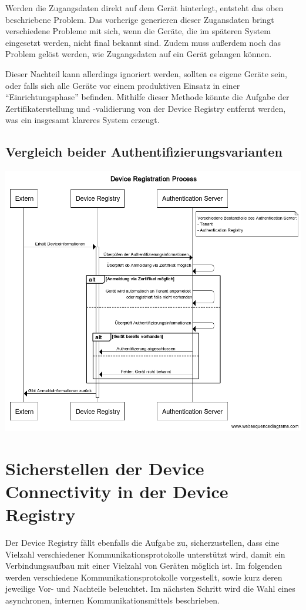 Werden die Zugangsdaten direkt auf dem Gerät hinterlegt, entsteht das oben beschriebene Problem. Das vorherige generieren dieser Zugansdaten bringt verschiedene Probleme mit sich, wenn die Geräte, die im späteren System eingesetzt werden, nicht final bekannt sind. Zudem muss außerdem noch das Problem gelöst werden, wie Zugangsdaten auf ein Gerät gelangen können.

Dieser Nachteil kann allerdings ignoriert werden, sollten es eigene Geräte sein, oder falls sich alle Geräte vor einem produktiven Einsatz in einer \enquote{Einrichtungsphase} befinden. Mithilfe dieser Methode könnte die Aufgabe der Zertifikaterstellung und -validierung von der Device Registry entfernt werden, was ein insgesamt klareres System erzeugt.

\subsection{Vergleich beider Authentifizierungsvarianten}

\includegraphics[width=0.8\linewidth]{img/device_registration.png}

\section{Sicherstellen der Device Connectivity in der Device Registry}

Der Device Registry fällt ebenfalls die Aufgabe zu, sicherzustellen, dass eine Vielzahl verschiedener Kommunikationsprotokolle unterstützt wird, damit ein Verbindungsaufbau mit einer Vielzahl von Geräten möglich ist. Im folgenden werden verschiedene Kommunikationsprotokolle vorgestellt, sowie kurz deren jeweilige Vor- und Nachteile beleuchtet. Im nächsten Schritt wird die Wahl eines asynchronen, internen Kommunikationsmittels beschrieben.

